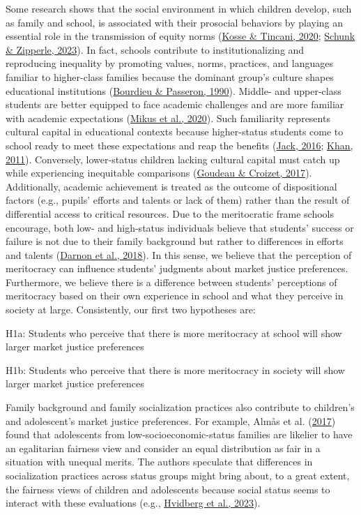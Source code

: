 \documentclass[
  letterpaper,
  DIV=11,
  numbers=noendperiod]{scrartcl}
\begin{document}
Some research shows that the social environment in which children
develop, such as family and school, is associated with their prosocial
behaviors by playing an essential role in the transmission of equity
norms (\protect\hyperlink{ref-kosse_prosociality_2020}{Kosse \& Tincani,
2020}; \protect\hyperlink{ref-schunk_fairness_2023}{Schunk \& Zipperle,
2023}). In fact, schools contribute to institutionalizing and
reproducing inequality by promoting values, norms, practices, and
languages familiar to higher-class families because the dominant group's
culture shapes educational institutions
(\protect\hyperlink{ref-bourdieu_reproduction_1990}{Bourdieu \&
Passeron, 1990}). Middle- and upper-class students are better equipped
to face academic challenges and are more familiar with academic
expectations (\protect\hyperlink{ref-mikus_children_2020}{Mikus et al.,
2020}). Such familiarity represents cultural capital in educational
contexts because higher-status students come to school ready to meet
these expectations and reap the benefits
(\protect\hyperlink{ref-jack_no_2016}{Jack, 2016};
\protect\hyperlink{ref-khan_privilege_2011}{Khan, 2011}). Conversely,
lower-status children lacking cultural capital must catch up while
experiencing inequitable comparisons
(\protect\hyperlink{ref-goudeau_hidden_2017}{Goudeau \& Croizet, 2017}).
Additionally, academic achievement is treated as the outcome of
dispositional factors (e.g., pupils' efforts and talents or lack of
them) rather than the result of differential access to critical
resources. Due to the meritocratic frame schools encourage, both low-
and high-status individuals believe that students' success or failure is
not due to their family background but rather to differences in efforts
and talents (\protect\hyperlink{ref-darnon_where_2018}{Darnon et al.,
2018}). In this sense, we believe that the perception of meritocracy can
influence students' judgments about market justice preferences.
Furthermore, we believe there is a difference between students'
perceptions of meritocracy based on their own experience in school and
what they perceive in society at large. Consistently, our first two
hypotheses are:

H1a: Students who perceive that there is more meritocracy at school will
show larger market justice preferences

H1b: Students who perceive that there is more meritocracy in society
will show larger market justice preferences

Family background and family socialization practices also contribute to
children's and adolescent's market justice preferences. For example,
Almås et al. (\protect\hyperlink{ref-almas_fairness_2017}{2017}) found
that adolescents from low-socioeconomic-status families are likelier to
have an egalitarian fairness view and consider an equal distribution as
fair in a situation with unequal merits. The authors speculate that
differences in socialization practices across status groups might bring
about, to a great extent, the fairness views of children and adolescents
because social status seems to interact with these evaluations (e.g.,
\protect\hyperlink{ref-hvidberg_social_2023}{Hvidberg et al., 2023}).
\end{document}
